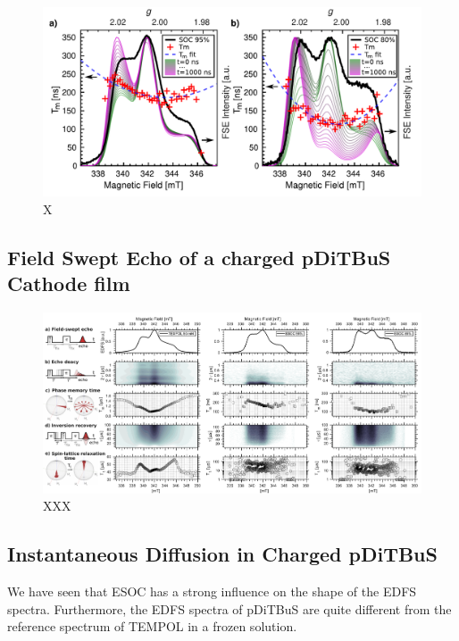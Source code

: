 \begin{figure}[h]
\center
	\includegraphics[width=1\textwidth]{./pulse/figures/Figure_6_maintext_col_MOD.pdf}
	\caption{X}
	\label{fig:FSE_reconstruction_with_T2}
\end{figure}



\subsection{Field Swept Echo of a charged pDiTBuS Cathode film}
\begin{figure}[h]
\center
	\includegraphics[width=1\textwidth]{./pulse/figures/FSE_DTBS_FSE_RELAX_T1Tm.pdf}
	\caption{XXX}
	\label{fig:Figure_FSE2}
\end{figure}

\subsection{Instantaneous Diffusion in Charged pDiTBuS}
\label{S:ID}


We have seen that  ESOC has a strong influence on the shape of the EDFS spectra. Furthermore, the EDFS spectra of pDiTBuS are quite different from the reference spectrum of TEMPOL in a  frozen solution. 

